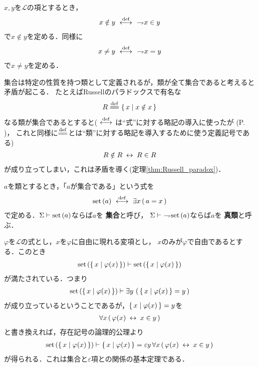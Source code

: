 	$x,y$を$\mathcal{L}$の項とするとき，
	\begin{align}
		x \notin y \ \overset{\mathrm{def}}{\longleftrightarrow}\ \ \rightharpoondown\hspace{-0.25em} x \in y
	\end{align}
	で$x \notin y$を定める．同様に
	\begin{align}
		x \neq y \ \overset{\mathrm{def}}{\longleftrightarrow}\ \ \rightharpoondown\hspace{-0.25em} x = y
	\end{align}
	で$x \neq y$を定める．
	
	集合は特定の性質を持つ類として定義されるが，類が全て集合であると考えると矛盾が起こる．
	たとえばRussellのパラドックスで有名な
	\begin{align}
		R \defeq \Set{x}{x \notin x}
	\end{align}
	なる類が集合であるとすると($\ \overset{\mathrm{def}}{\longleftrightarrow}\ $は``式''に対する略記の導入に使ったが
	(P. \pageref{fom:defining_arrow})，
	これと同様に$\defeq$とは``類''に対する略記を導入するために使う定義記号である)
	\begin{align}
		R \notin R \hspace{0.25em}\leftrightarrow\hspace{0.25em} R \in R
	\end{align}
	が成り立ってしまい，これは矛盾を導く(定理\ref{thm:Russell_paradox})．
	
	\begin{screen}
		\begin{dfn}[集合]
			$a$を類とするとき，「$a$が集合である」という式を
			\begin{align}
				\operatorname*{set}\hspace{0.15em}(a) \ \overset{\mathrm{def}}{\longleftrightarrow}\  \exists x\, (\, a = x\, )
			\end{align}
			で定める．$\Sigma \vdash \operatorname*{set}\hspace{0.15em}(a)$ならば$a$を
			{\bf 集合}と呼び，
			$\Sigma \vdash\ \rightharpoondown\hspace{-0.25em} \operatorname*{set}\hspace{0.15em}(a)$ならば$a$を
			{\bf 真類}と呼ぶ．
		\end{dfn}
	\end{screen}
	
	$\varphi$を$\mathcal{L}$の式とし，$x$を$\varphi$に自由に現れる変項とし，
	$x$のみが$\varphi$で自由であるとする．このとき
	\begin{align}
		\operatorname*{set}\hspace{0.15em}(\{\, x \mid \varphi(x)\, \}) \vdash \operatorname*{set}\hspace{0.15em}(\{\, x \mid \varphi(x)\, \})
	\end{align}
	が満たされている．つまり
	\begin{align}
		\operatorname*{set}\hspace{0.15em}(\{\, x \mid \varphi(x)\, \})
		\vdash \exists y\, \left(\, \{\, x \mid \varphi(x)\, \} = y\, \right)
	\end{align}
	が成り立っているということであるが，$\{\, x \mid \varphi(x)\, \} = y$を
	\begin{align}
		\forall x\, (\, \varphi(x) \hspace{0.25em}\leftrightarrow\hspace{0.25em} x \in y\, )
	\end{align}
	と書き換えれば，存在記号の論理的公理より
	\begin{align}
		\operatorname*{set}\hspace{0.15em}(\{\, x \mid \varphi(x)\, \}) \vdash \{\, x \mid \varphi(x)\, \} = 
		\varepsilon y\, \forall x\, (\, \varphi(x) \hspace{0.25em}\leftrightarrow\hspace{0.25em} x \in y\, )
	\end{align}
	が得られる．これは集合と$\varepsilon$項との関係の基本定理である．
	

